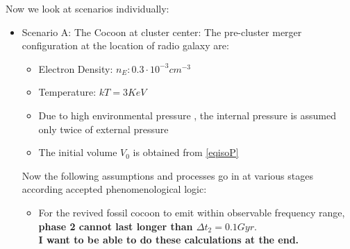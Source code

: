 \documentclass[11pt]{report}
\newcommand{\tbf}[1]{\textbf{#1}}
\begin{document}
Now we look at scenarios individually:
\begin{itemize}
\item {Scenario A: The Cocoon at cluster center:}
The pre-cluster merger configuration at the location of radio galaxy are:

\begin{itemize}
\item Electron Density: $n_E: 0.3 \cdot 10^{-3}cm^{-3}$
\item Temperature: $kT=3KeV$
\item Due to high environmental pressure , the internal pressure is assumed only twice of external pressure
\item The initial volume $V_0$ is obtained from \eqref{eqisoP} 
\end{itemize}
Now the following assumptions and processes go in at various stages according accepted phenomenological logic:
\begin{itemize}

 
\item For the revived fossil cocoon to emit within observable frequency range, \tbf{phase 2 cannot last longer than $\Delta t_2=0.1Gyr$}.\\

 \tbf{I want to be able to do these calculations at the end.}
 

\end{itemize}
\end{itemize}
\end{document}
